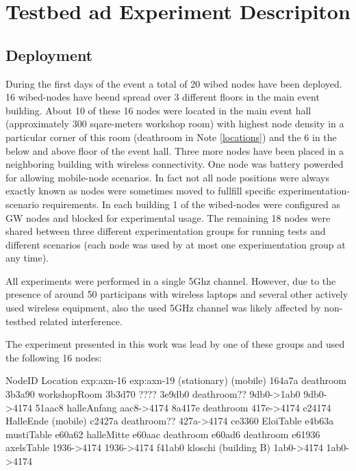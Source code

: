 \documentclass[a4paper,12pt,twoside]{article}
\begin{document}
\section{Testbed ad Experiment Descripiton}

\subsection{Deployment}

During the first days of the event a total of 20 wibed nodes have been
deployed. 16 wibed-nodes have beend spread over 3 different floors in
the main event building. About 10 of these 16 nodes were located in
the main event hall (approximately 300 sqare-meters workshop room)
with highest node density in a particular corner of this room
(deathroom in Note \ref{locations}) and the 6 in the below and above floor of the event
hall. Three more nodes have been placed in a neighboring building with
wireless connectivity.  One node was battery powerded for allowing
mobile-node scenarios.  In fact not all node positions were always
exactly known as nodes were sometimes moved to fullfill specific
experimentation-scenario requirements.  In each building 1 of the
wibed-nodes were configured as GW nodes and blocked for experimental
usage. The remaining 18 nodes were shared between three different
experimentation groups for running tests and different scenarios (each
node was used by at most one experimentation group at any time).

All experiments were performed in a single 5Ghz channel. However, due
to the presence of around 50 participans with wireless laptops and
several other actively used wireless equipment, also the used 5GHz
channel was likely affected by non-testbed related interference.

The experiment presented in this work was lead by one of these groups
and used the following 16 nodes:

\begin{rawtext}[caption={Node locations and experiment usage}, label=locations]
NodeID  Location               exp:axn-16   exp:axn-19
                               (stationary) (mobile)
164a7a  deathroom
3b3a90  workshopRoom
3b3d70  ????
3e9db0  deathroom??            9db0->1ab0  9db0->4174
51aac8  halleAnfang                        aac8->4174
8a417e  deathroom              417e->4174   
c24174  HalleEnde (mobile)                  
c2427a  deathroom??                        427a->4174
ce3360  EloiTable
e4b63a  mustiTable
e60a62  halleMitte
e60aac  deathroom
e60ad6  deathroom
e61936  axelsTable             1936->4174  1936->4174
f41ab0  kloschi (building B)   1ab0->4174  1ab0->4174
\end{rawtext}
\end{document}
